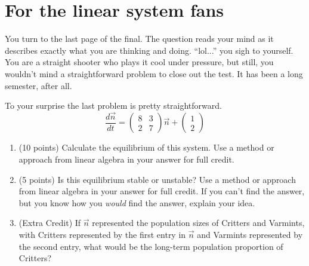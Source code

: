 \documentclass[11pt,onecolumn,superscriptaddress,notitlepage]{article}
\newcommand{\aaa}[0]{5 }
\newcommand{\bbb}[0]{10 }
\begin{document}
\clearpage
\section{For the linear system fans}

You turn to the last page of the final. The question reads your mind as it describes exactly what you are thinking and doing. ``lol...'' you sigh to yourself. You are a straight shooter who plays it cool under pressure, but still, you wouldn't mind a straightforward problem to close out the test. It has been a long semester, after all. 

To your surprise the last problem is pretty straightforward.
$$
\frac{d\vec{n}}{dt}  =
\begin{pmatrix}
8 & 3 \\ 2 & 7
\end{pmatrix}
\vec{n}
+ \begin{pmatrix}
1\\2
\end{pmatrix}
$$
\begin{enumerate}[resume]
	\item (\bbb points) Calculate the equilibrium of this system. Use a method or approach from linear algebra in your answer for full credit. 
	\vspace{2in}
	
	\item (\aaa points) Is this equilibrium stable or unstable? Use a method or approach from linear algebra in your answer for full credit. If you can't find the answer, but you know how you {\it would} find the answer, explain your idea.
	\vspace{2in}
	
	\item (Extra Credit) If $\vec{n}$ represented the population sizes of Critters and Varmints, with Critters represented by the first entry in $\vec{n}$ and Varmints represented by the second entry, what would be the long-term population proportion of Critters?
\end{enumerate}

 \ 
\end{document}
